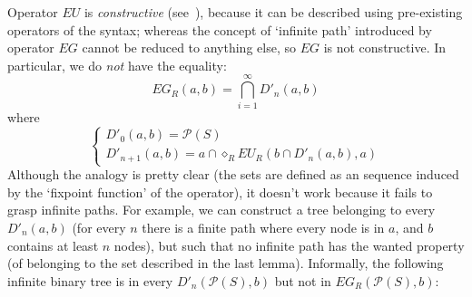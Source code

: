 \documentclass[11pt]{article}
\theoremstyle{definition}
\begin{document}
Operator $EU$ is \emph{constructive} (see~\cite[Intro]{SantoMu}), because it can be described using pre-existing operators of the syntax; whereas the concept of `infinite path' introduced by operator $EG$ cannot be reduced to anything else, so $EG$ is not constructive. In particular, we do \emph{not} have the equality: \[EG_R(a,b)=\bigcap_{i=1}^\infty D'_n(a,b)\] where
\begin{equation*}
    \begin{cases}
        D'_0(a,b)=\mathcal{P}(S)\\
        D'_{n+1}(a,b)=a\cap\diamond_R EU_R(b\cap D'_n(a,b),a)
    \end{cases}
\end{equation*}
Although the analogy is pretty clear (the sets are defined as an sequence induced by the `fixpoint function' of the operator), it doesn't work because it fails to grasp infinite paths. For example, we can construct a tree belonging to every $D'_n(a,b)$ (for every $n$ there is a finite path where every node is in $a$, and $b$ contains at least $n$ nodes), but such that no infinite path has the wanted property (of belonging to the set described in the last lemma). Informally, the following infinite binary tree is in every $D'_n(\mathcal{P}(S),b)$ but not in $EG_R(\mathcal{P}(S),b)$:
\begin{center} 
\end{center}
\end{document}

